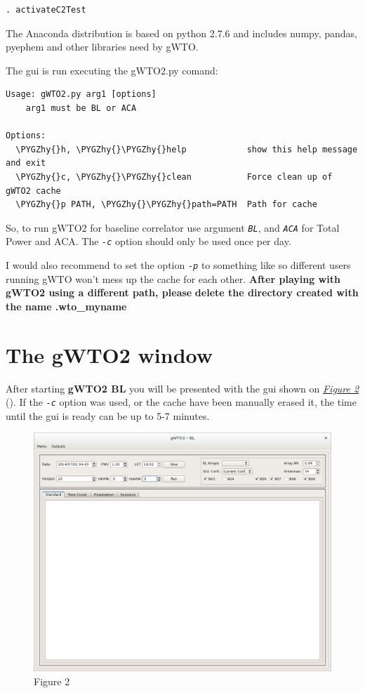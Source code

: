 \documentclass[a4paper,10pt,english]{sphinxmanual}
\def\PYGZhy{\char`\-}
\begin{document}
\begin{Verbatim}[commandchars=\\\{\}]
. activateC2Test
\end{Verbatim}

The Anaconda distribution is based on python 2.7.6 and includes numpy, pandas,
pyephem and other libraries need by gWTO.

The gui is run executing the gWTO2.py comand:

\begin{Verbatim}[commandchars=\\\{\}]
Usage: gWTO2.py arg1 [options]
    arg1 must be BL or ACA

Options:
  \PYGZhy{}h, \PYGZhy{}\PYGZhy{}help            show this help message and exit
  \PYGZhy{}c, \PYGZhy{}\PYGZhy{}clean           Force clean up of gWTO2 cache
  \PYGZhy{}p PATH, \PYGZhy{}\PYGZhy{}path=PATH  Path for cache
\end{Verbatim}

So, to run gWTO2 for baseline correlator use argument \emph{\texttt{BL}}, and
\emph{\texttt{ACA}} for Total Power and ACA. The \emph{\texttt{-c}} option should only be
used once per day.

I would also recommend to set the option \emph{\texttt{-p}} to something like
 so different users running gWTO won't mess up the cache
for each other. \textbf{After playing with gWTO2 using a different path, please}
\textbf{delete the directory created with the name .wto\_myname}


\section{The gWTO2 window}
\label{usingwto:the-gwto2-window}
After starting \textbf{gWTO2 BL} you will be presented with the gui shown on
{\hyperref[usingwto:fig2]{\emph{Figure 2}}} ().
If the \emph{\texttt{-c}} option was used, or the cache have been manually erased it,
the time until the gui is ready can be up to 5-7 minutes.
\begin{figure}[htbp]
\centering
\capstart

\includegraphics{gWTO2__BL_001.png}
\caption{Figure 2}\label{usingwto:fig2}\end{figure}
\end{document}
